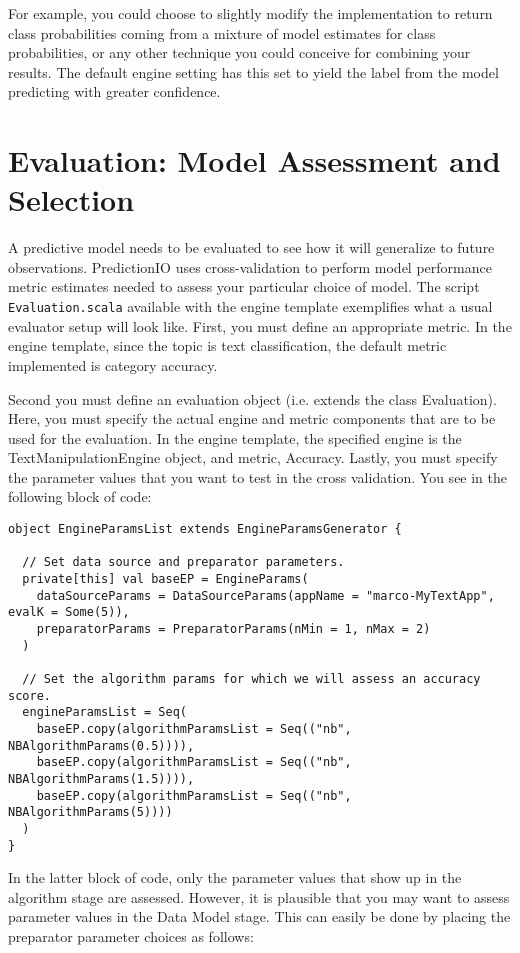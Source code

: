 \documentclass[a4paper,12pt]{article}
\renewcommand{\tt}[1]{\texttt{#1}}
\newcommand{\3}{\left}
\newcommand{\4}{\right}
\renewcommand{\-}[1]{{}^{-#1}}
\begin{document}
For example, you could choose to slightly modify the implementation to return class probabilities coming from a mixture of model estimates for class probabilities, or any other technique you could conceive for combining your results. The default engine setting has this set to yield the label from the model predicting with greater confidence.
 
 
 
 \section*{Evaluation: Model Assessment and Selection}
 
 A predictive model needs to be evaluated to see how it will generalize to future observations. PredictionIO uses cross-validation to perform model performance metric estimates needed to assess your particular choice of model. The script \tt{Evaluation.scala} available with the engine template exemplifies what a usual evaluator setup will look like. First, you must define an appropriate metric. In the engine template, since the topic is text classification, the default metric implemented is category accuracy. 

 Second you must define an evaluation object (i.e. extends the class Evaluation).
Here, you must specify the actual engine and metric components that are to be used for the evaluation. In the engine template, the specified engine is the TextManipulationEngine object, and metric, Accuracy. Lastly, you must specify the parameter values that you want to test in the cross validation. You see in the following block of code:

\break

\begin{verbatim}
object EngineParamsList extends EngineParamsGenerator {

  // Set data source and preparator parameters.
  private[this] val baseEP = EngineParams(
    dataSourceParams = DataSourceParams(appName = "marco-MyTextApp", evalK = Some(5)),
    preparatorParams = PreparatorParams(nMin = 1, nMax = 2)
  )

  // Set the algorithm params for which we will assess an accuracy score.
  engineParamsList = Seq(
    baseEP.copy(algorithmParamsList = Seq(("nb", NBAlgorithmParams(0.5)))),
    baseEP.copy(algorithmParamsList = Seq(("nb", NBAlgorithmParams(1.5)))),
    baseEP.copy(algorithmParamsList = Seq(("nb", NBAlgorithmParams(5))))
  )
}
\end{verbatim}
In the latter block of code, only the parameter values that show up in the algorithm stage are assessed. However, it is plausible that you may want to assess parameter values in the Data Model stage. This can easily be done by placing the preparator parameter choices as follows:
\end{document}

